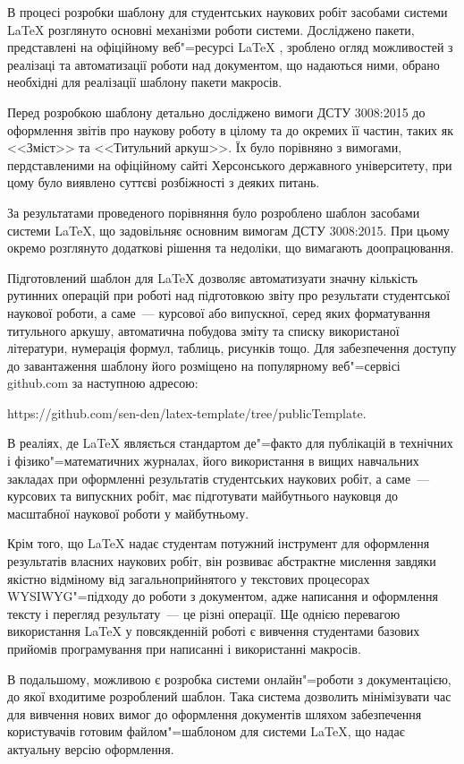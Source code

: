 
В процесі розробки шаблону для студентських наукових робіт засобами системи \LaTeX{} розглянуто основні механізми роботи системи. Досліджено пакети, представлені на офіційному веб"=ресурсі \LaTeX{} \cite{www:ctan}, зроблено огляд можливостей з реалізаці та автоматизації роботи над документом, що надаються ними, обрано необхідні для реалізації шаблону пакети макросів.

Перед розробкою шаблону детально досліджено вимоги ДСТУ 3008:2015 до оформлення звітів про наукову роботу в цілому та до окремих її частин, таких як <<Зміст>> та <<Титульний аркуш>>. Їх було порівняно з вимогами, пердставленими на офіційному сайті Херсонського державного університету, при цому було виявлено суттєві розбіжності з деяких питань.

За результатами проведеного порівняння було розроблено шаблон засобами системи \LaTeX{}, що задовільняє основним вимогам ДСТУ 3008:2015. При цьому окремо розглянуто додаткові рішення та недоліки, що вимагають доопрацювання.

Підготовлений шаблон для \LaTeX{} дозволяє автоматизуати значну кількість рутинних операцій при роботі над підготовкою звіту про результати студентської наукової роботи, а саме~--- курсової або випускної, серед яких форматування титульного аркушу, автоматична побудова зміту та списку використаної літератури, нумерація формул, таблиць, рисунків тощо. Для забезпечення доступу до завантаження шаблону його розміщено на популярному веб"=сервісі github.com за наступною адресою:

https://github.com/sen-den/latex-template/tree/publicTemplate.

В реаліях, де \LaTeX{} являється стандартом де"=факто для публікацій в технічних і фізико"=математичних журналах, його використання в вищих навчальних закладах при оформленні результатів студентських наукових робіт, а саме~--- курсових та випускних робіт, має підготувати майбутнього науковця до масштабної наукової роботи у майбутньому.

Крім того, що \LaTeX{} надає студентам потужний інструмент для оформлення результатів власних наукових робіт, він розвиває абстрактне мислення завдяки якістно відміному від загальноприйнятого у текстових процесорах WYSIWYG"=підходу до роботи з документом, адже написання и оформлення тексту і перегляд результату~--- це різні операції. Ще однією перевагою використання \LaTeX{} у повсякденній роботі є вивчення студентами базових прийомів програмування при написанні і використанні макросів.

В подальшому, можливою є розробка системи онлайн"=роботи з документацією, до якої входитиме розроблений шаблон. Така система дозволить мінімізувати час для вивчення нових вимог до оформлення документів шляхом забезпечення користувачів готовим файлом"=шаблоном для системи \LaTeX{}, що надає актуальну версію оформлення.
